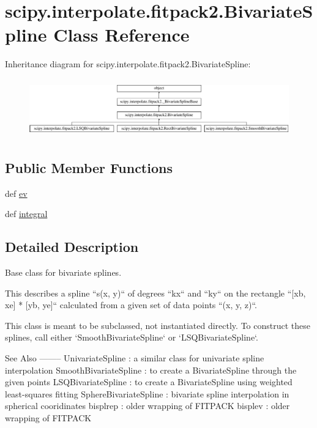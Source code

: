 \hypertarget{classscipy_1_1interpolate_1_1fitpack2_1_1BivariateSpline}{}\section{scipy.\+interpolate.\+fitpack2.\+Bivariate\+Spline Class Reference}
\label{classscipy_1_1interpolate_1_1fitpack2_1_1BivariateSpline}
Inheritance diagram for scipy.\+interpolate.\+fitpack2.\+Bivariate\+Spline\+:\begin{figure}[H]
\begin{center}
\leavevmode
\includegraphics[height=2.565865cm]{classscipy_1_1interpolate_1_1fitpack2_1_1BivariateSpline}
\end{center}
\end{figure}
\subsection*{Public Member Functions}
\begin{DoxyCompactItemize}
\item 
def \hyperlink{classscipy_1_1interpolate_1_1fitpack2_1_1BivariateSpline_ab7ebccfd13c160ed6a00fe9cfd0043fb}{ev}
\item 
def \hyperlink{classscipy_1_1interpolate_1_1fitpack2_1_1BivariateSpline_acd7041cb76e1c57dcebc59f429a887f3}{integral}
\end{DoxyCompactItemize}


\subsection{Detailed Description}
\begin{DoxyVerb}Base class for bivariate splines.

This describes a spline ``s(x, y)`` of degrees ``kx`` and ``ky`` on
the rectangle ``[xb, xe] * [yb, ye]`` calculated from a given set
of data points ``(x, y, z)``.

This class is meant to be subclassed, not instantiated directly.
To construct these splines, call either `SmoothBivariateSpline` or
`LSQBivariateSpline`.

See Also
--------
UnivariateSpline : a similar class for univariate spline interpolation
SmoothBivariateSpline :
    to create a BivariateSpline through the given points
LSQBivariateSpline :
    to create a BivariateSpline using weighted least-squares fitting
SphereBivariateSpline :
    bivariate spline interpolation in spherical cooridinates
bisplrep : older wrapping of FITPACK
bisplev : older wrapping of FITPACK\end{DoxyVerb}
 

